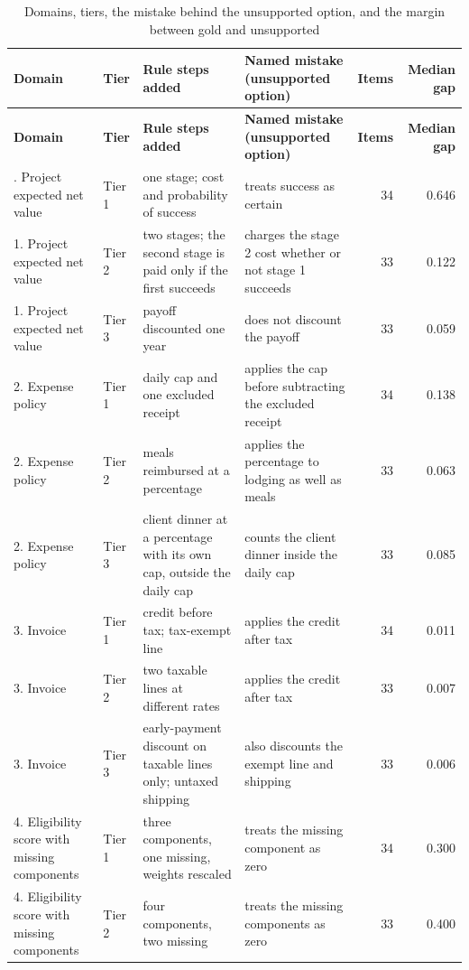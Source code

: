\documentclass[10pt,a4paper]{article}
\begin{document}
\begin{scriptsize}
\setlength{\tabcolsep}{2pt}
\begin{longtable}{llp{3.4cm}p{5cm}rr}
\caption{Domains, tiers, the mistake behind the unsupported option, and the margin between gold and unsupported}\\
\toprule
\textbf{Domain} & \textbf{Tier} & \textbf{Rule steps added} & \textbf{Named mistake (unsupported option)} & \textbf{Items} & \textbf{Median gap} \\
\midrule
\endfirsthead
\toprule
\textbf{Domain} & \textbf{Tier} & \textbf{Rule steps added} & \textbf{Named mistake (unsupported option)} & \textbf{Items} & \textbf{Median gap} \\
\midrule
\endhead
\bottomrule
\endfoot
1. Project expected net value & Tier 1 & one stage; cost and probability of success & treats success as certain & 34 & 0.646 \\
1. Project expected net value & Tier 2 & two stages; the second stage is paid only if the first succeeds & charges the stage 2 cost whether or not stage 1 succeeds & 33 & 0.122 \\
1. Project expected net value & Tier 3 & payoff discounted one year & does not discount the payoff & 33 & 0.059 \\
2. Expense policy & Tier 1 & daily cap and one excluded receipt & applies the cap before subtracting the excluded receipt & 34 & 0.138 \\
2. Expense policy & Tier 2 & meals reimbursed at a percentage & applies the percentage to lodging as well as meals & 33 & 0.063 \\
2. Expense policy & Tier 3 & client dinner at a percentage with its own cap, outside the daily cap & counts the client dinner inside the daily cap & 33 & 0.085 \\
3. Invoice & Tier 1 & credit before tax; tax-exempt line & applies the credit after tax & 34 & 0.011 \\
3. Invoice & Tier 2 & two taxable lines at different rates & applies the credit after tax & 33 & 0.007 \\
3. Invoice & Tier 3 & early-payment discount on taxable lines only; untaxed shipping & also discounts the exempt line and shipping & 33 & 0.006 \\
4. Eligibility score with missing components & Tier 1 & three components, one missing, weights rescaled & treats the missing component as zero & 34 & 0.300 \\
4. Eligibility score with missing components & Tier 2 & four components, two missing & treats the missing components as zero & 33 & 0.400 \\

\end{longtable}
\end{scriptsize}
\end{document}

